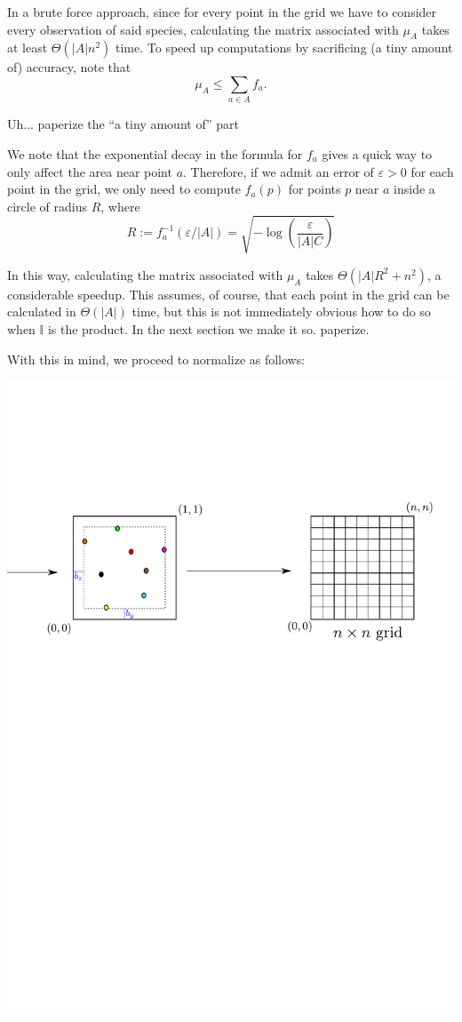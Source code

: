 \documentclass[12pt]{article}
\numberwithin{equation}{section} %
\numberwithin{figure}{section} %
\def\II{{\mathbb{I}}}
\theoremstyle{definition}
\def\tcr#1{\textcolor{MyRed}{#1}}
\begin{document}
	In a brute force approach, since for every point in the grid we have to consider every observation of said species, calculating the matrix associated with $\mu_A$ takes at least $\Theta(|A|n^2)$ time. To speed up computations by sacrificing \tcr{(a tiny amount of)} accuracy, note that 
		$$\mu_A \leq \sum_{a\in A} f_a.$$
		
		\tcr{Uh... paperize the ``a tiny amount of'' part}
		
	We note that the exponential decay in the formula for $f_a$ gives a quick way to only affect the area near point $a$. Therefore, if we admit an error of $\varepsilon > 0$ for each point in the grid, we only need to compute $f_a(p)$ for points $p$ near $a$ inside a circle of radius $R$, where
		$$R := f_a^{-1}(\varepsilon/|A|) = \sqrt{-\log\left(\frac{\varepsilon}{|A|C}\right)}$$
	
	In this way, calculating the matrix associated with $\mu_A$ takes $\Theta(|A|R^2 + n^2)$, a considerable speedup. This assumes, of course, that each point in the grid can be calculated in $\Theta(|A|)$ time, but this is not immediately obvious how to do so when $\II$ is the product. In the next section we make it so. \tcr{paperize}.
	
	With this in mind, we proceed to normalize as follows:
	\begin{center}
		\includegraphics[scale=0.5]{./continuoamalla.pdf}
	\end{center}
	
\end{document}
